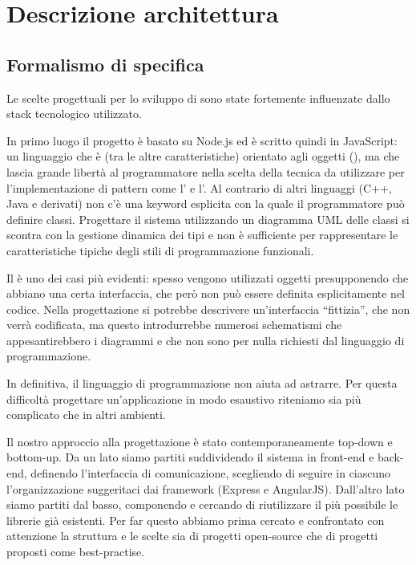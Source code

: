 \section{Descrizione architettura}


\subsection{Formalismo di specifica}

Le scelte progettuali per lo sviluppo di \ProjectName{} sono state fortemente influenzate dallo stack tecnologico utilizzato.

In primo luogo il progetto è basato su Node.js ed è scritto quindi in JavaScript: un linguaggio che è (tra le altre caratteristiche) orientato agli oggetti (), ma che lascia grande libertà al programmatore nella scelta della tecnica da utilizzare per l'implementazione di pattern come l' e l'. Al contrario di altri linguaggi (C++, Java e derivati) non c'è una keyword esplicita con la quale il programmatore può definire classi. Progettare il sistema utilizzando un diagramma UML delle classi si scontra con la gestione dinamica dei tipi e non è sufficiente per rappresentare le caratteristiche tipiche degli stili di programmazione funzionali.

Il  è uno dei casi più evidenti: spesso vengono utilizzati oggetti presupponendo che abbiano una certa interfaccia, che però non può essere definita esplicitamente nel codice. Nella progettazione si potrebbe descrivere un'interfaccia ``fittizia'', che non verrà codificata, ma questo introdurrebbe numerosi schematismi che appesantirebbero i diagrammi e che non sono per nulla richiesti dal linguaggio di programmazione.

In definitiva, il linguaggio di programmazione non aiuta ad astrarre. Per questa difficoltà progettare un'applicazione in modo esaustivo riteniamo sia più complicato che in altri ambienti.

Il nostro approccio alla progettazione è stato contemporaneamente top-down e bottom-up. Da un lato siamo partiti suddividendo il sistema in front-end e back-end, definendo l'interfaccia di comunicazione, scegliendo di seguire in ciascuno l'organizzazione suggeritaci dai framework (Express e AngularJS). Dall'altro lato siamo partiti dal basso, componendo e cercando di riutilizzare il più possibile le librerie già esistenti. Per far questo abbiamo prima cercato e confrontato con attenzione la struttura e le scelte sia di progetti open-source che di progetti proposti come best-practise.

